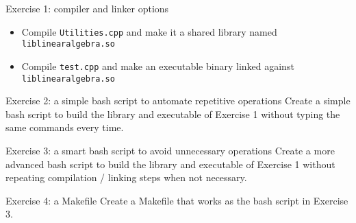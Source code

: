 \documentclass[10pt]{beamer}
\begin{document}
\begin{frame}{Exercise 1: compiler and linker options}
  \begin{itemize}
  \item Compile \texttt{Utilities.cpp} and make it a shared library named \texttt{liblinearalgebra.so}\\[5mm]
  \item Compile \texttt{test.cpp} and make an executable binary linked against \texttt{liblinearalgebra.so}
  \end{itemize}
\end{frame}

\begin{frame}{Exercise 2: a simple bash script to automate repetitive operations}
  Create a simple bash script to build the library and executable of Exercise 1 without typing the same commands every time.
\end{frame}

\begin{frame}{Exercise 3: a smart bash script to avoid unnecessary operations}
  Create a more advanced bash script to build the library and executable of Exercise 1 without repeating compilation / linking steps when not necessary.
\end{frame}

\begin{frame}{Exercise 4: a Makefile}
  Create a Makefile that works as the bash script in Exercise 3.
\end{frame}
\end{document}
